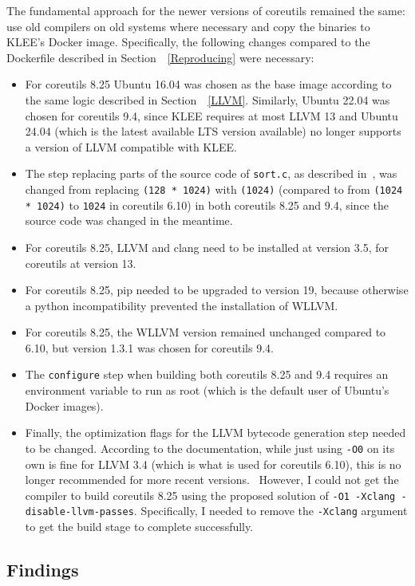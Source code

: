 \documentclass{article}
\let\savedCite=\cite
\renewcommand{\cite}{\unskip~\savedCite}
\let\savedRef=\ref
\renewcommand{\ref}{\unskip~\savedRef}
\begin{document}
The fundamental approach for the newer versions of coreutils remained the same: use old compilers on old systems where necessary and copy the binaries to KLEE's Docker image. Specifically, the following changes compared to the Dockerfile described in Section~\ref{Reproducing} were necessary:
\begin{itemize}
    \item For coreutils 8.25 Ubuntu 16.04 was chosen as the base image according to the same logic described in Section~\ref{LLVM}. Similarly, Ubuntu 22.04 was chosen for coreutils 9.4, since KLEE requires at most LLVM 13 and Ubuntu 24.04 (which is the latest available LTS version available) no longer supports a version of LLVM compatible with KLEE.
    \item The step replacing parts of the source code of \lstinline{sort.c}, as described in\cite{KLEEFAQ}, was changed from replacing \lstinline{(128 * 1024)} with \lstinline{(1024)} (compared to from \lstinline{(1024 * 1024)} to \lstinline{1024} in coreutils 6.10) in both coreutils 8.25 and 9.4, since the source code was changed in the meantime.
    \item For coreutils 8.25, LLVM and clang need to be installed at version 3.5, for coreutils at version 13.
    \item For coreutils 8.25, pip needed to be upgraded to version 19, because otherwise a python incompatibility prevented the installation of WLLVM.
    \item For coreutils 8.25, the WLLVM version remained unchanged compared to 6.10, but version 1.3.1 was chosen for coreutils 9.4.
    \item The \lstinline{configure} step when building both coreutils 8.25 and 9.4 requires an environment variable to run as root (which is the default user of Ubuntu's Docker images).
    \item Finally, the optimization flags for the LLVM bytecode generation step needed to be changed. According to the documentation, while just using \lstinline{-O0} on its own is fine for LLVM 3.4 (which is what is used for coreutils 6.10), this is no longer recommended for more recent versions.\cite{KLEETutorial,KLEEIssue} However, I could not get the compiler to build coreutils 8.25 using the proposed solution of \lstinline{-O1 -Xclang -disable-llvm-passes}. Specifically, I needed to remove the \lstinline{-Xclang} argument to get the build stage to complete successfully.
\end{itemize}

\subsection{Findings}
\end{document}
